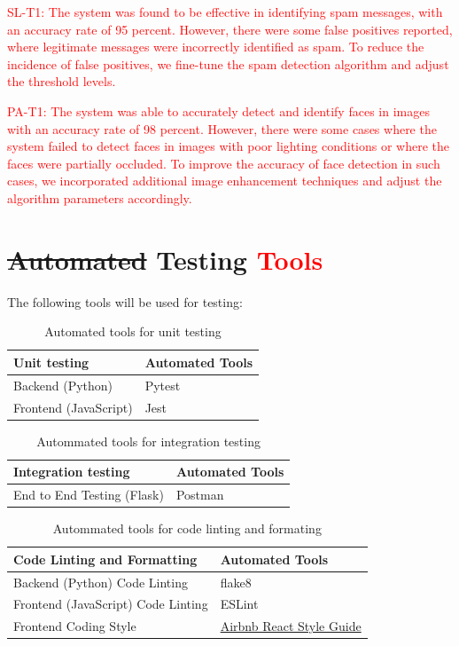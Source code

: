 \documentclass[12pt, titlepage]{article}
\begin{document}
\textcolor{red}{SL-T1: The system was found to be effective in identifying spam messages, with an accuracy rate of 95 percent.
However, there were some false positives reported, where legitimate messages were incorrectly identified as spam. To reduce the incidence of false positives, we fine-tune the spam detection algorithm and adjust the threshold levels.}

\textcolor{red}{PA-T1: The system was able to accurately detect and identify faces in images with an accuracy rate of 98 percent. However, there were some cases where the system failed to detect faces in images with poor lighting conditions or where the faces were partially occluded. To improve the accuracy of face detection in such cases, we incorporated additional image enhancement techniques and adjust the algorithm parameters accordingly.}



\section{\sout{Automated} Testing \textcolor{red}{Tools}}
The following tools will be used for testing:

\begin{table}[ht!]
    \centering
    \begin{tabular}{p{}|p{}}
    \hline
        \textbf{Unit testing} & \textbf{Automated Tools} \\ \hline
        Backend (Python) & Pytest \\ \hline
        Frontend (JavaScript) & Jest \\ \hline
    \end{tabular}
    \caption{Automated tools for unit testing}
\end{table}

\begin{table}[!h]
    \centering
    \begin{tabular}{p{}|p{}}
    \hline
        \textbf{Integration testing} & \textbf{Automated Tools} \\ \hline
        End to End Testing (Flask) & Postman \\ \hline
    \end{tabular}
    \caption{Autommated tools for integration testing}
\end{table}

\begin{table}[!h]
    \centering
    \begin{tabular}{p{}|p{}}
    \hline
        \textbf{Code Linting and Formatting} & \textbf{Automated Tools} \\ \hline
        Backend (Python) Code Linting & flake8 \\ \hline
        Frontend (JavaScript) Code Linting & ESLint \\ \hline
        Frontend Coding Style & \href{https://airbnb.io/javascript/react/}{Airbnb React Style Guide} \\ \hline
    \end{tabular}
    \caption{Autommated tools for code linting and formating}
\end{table}
\end{document}
